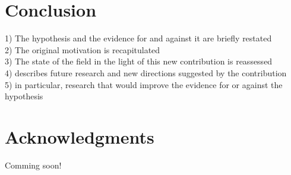 \documentclass{amia}
\begin{document}
\section*{Conclusion}
1) The hypothesis and the evidence for and against it are briefly restated \\
2) The original motivation is recapitulated \\
3) The state of the field in the light of this new contribution is reassessed \\
4) describes future research and new directions suggested by the contribution\\
5) in particular, research that would improve the evidence for or against the hypothesis

\section*{Acknowledgments}
Comming soon!



\end{document}
